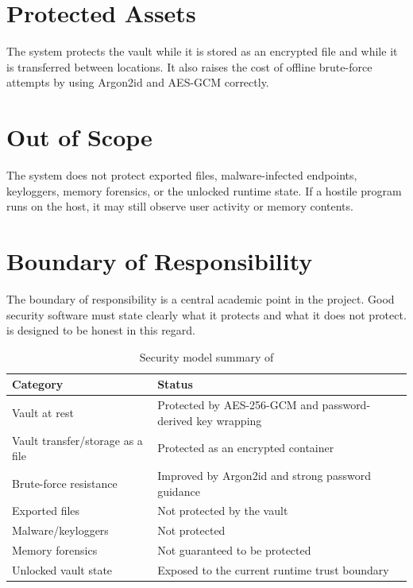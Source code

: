 \section{Protected Assets}
The system protects the vault while it is stored as an encrypted file and while it is transferred between locations. It also raises the cost of offline brute-force attempts by using Argon2id and AES-GCM correctly.

\section{Out of Scope}
The system does not protect exported files, malware-infected endpoints, keyloggers, memory forensics, or the unlocked runtime state. If a hostile program runs on the host, it may still observe user activity or memory contents.

\section{Boundary of Responsibility}
The boundary of responsibility is a central academic point in the project. Good security software must state clearly what it protects and what it does not protect. \projname{} is designed to be honest in this regard.

\begin{table}[h]
\centering
\caption{Security model summary of \projname{}}
\begingroup
\renewcommand{\arraystretch}{1.3}
\begin{tabular}{l l}
\hline
\rowcolor[HTML]{67FD9A}
{\bfseries Category} & {\bfseries Status} \\
\hline
\rowcolor[HTML]{EFEFEF}
Vault at rest & Protected by AES-256-GCM and password-derived key wrapping \\
\hline
Vault transfer/storage as a file & Protected as an encrypted container \\
\hline
\rowcolor[HTML]{EFEFEF}
Brute-force resistance & Improved by Argon2id and strong password guidance \\
\hline
Exported files & Not protected by the vault \\
\hline
\rowcolor[HTML]{EFEFEF}
Malware/keyloggers & Not protected \\
\hline
Memory forensics & Not guaranteed to be protected \\
\hline
\rowcolor[HTML]{EFEFEF}
Unlocked vault state & Exposed to the current runtime trust boundary \\
\hline
\end{tabular}
\endgroup
\label{tab:security-model}
\end{table}
